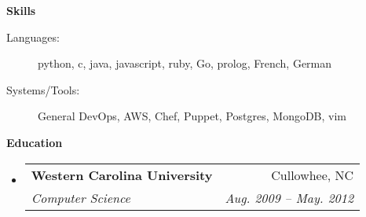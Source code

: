 \documentclass[letterpaper,8pt]{article}
\makeatletter
\newcommand{\resitem}[1]{\item #1 \vspace{-2pt}}
\newcommand{\resheading}[1]{{\large \colorbox{mygrey}{\begin{minipage}{\textwidth}{\textbf{#1 \vphantom{p\^{E}}}}\end{minipage}}}}
\newcommand{\ressubheading}[4]{
\begin{tabular*}{2.0in}{l@{\extracolsep{\fill}}r}
		\textbf{#1} & #2 \\
		\textit{#3} & \textit{#4} \\
\end{tabular*}\vspace{-6pt}}
\makeatother
\begin{document}
\resheading{Skills}
\begin{description}
\item[Languages:]
python, c, java, javascript, ruby, Go, prolog, French, German
\item[Systems/Tools:]
General DevOps, AWS, Chef, Puppet, Postgres, MongoDB, vim
\end{description}
\resheading{Education}
\begin{itemize}
\item
   \ressubheading{Western Carolina University}{Cullowhee, NC}{Computer Science}{Aug. 2009 -- May. 2012}
\end{itemize}
\end{document}

